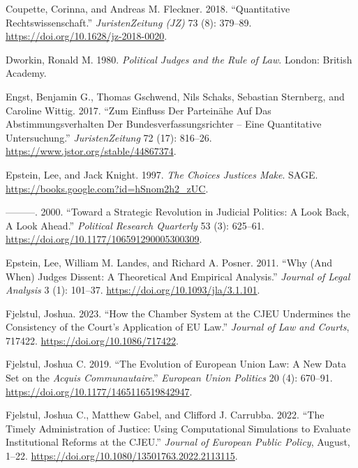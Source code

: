 \documentclass[
  11pt,
]{article}
\newlength{\cslhangindent}
\newenvironment{CSLReferences}[2] %
 {%
  \setlength{\parindent}{0pt}
  \ifodd #1 \everypar{\setlength{\hangindent}{\cslhangindent}}\ignorespaces\fi
  \ifnum #2 > 0
  \setlength{\parskip}{#2\baselineskip}
  \fi
 }%
 {}
\begin{document}
\begin{CSLReferences}{1}{0}
\leavevmode{}%
Coupette, Corinna, and Andreas M. Fleckner. 2018. {``Quantitative
{Rechtswissenschaft}.''} \emph{JuristenZeitung (JZ)} 73 (8): 379--89.
\url{https://doi.org/10.1628/jz-2018-0020}.

\leavevmode{}%
Dworkin, Ronald M. 1980. \emph{Political Judges and the Rule of Law}.
{London}: {British Academy}.

\leavevmode{}%
Engst, Benjamin G., Thomas Gschwend, Nils Schaks, Sebastian Sternberg,
and Caroline Wittig. 2017. {``Zum {Einfluss} Der {Parteinähe} Auf Das
{Abstimmungsverhalten} Der {Bundesverfassungsrichter} -- Eine
Quantitative {Untersuchung}.''} \emph{JuristenZeitung} 72 (17): 816--26.
\url{https://www.jstor.org/stable/44867374}.

\leavevmode{}%
Epstein, Lee, and Jack Knight. 1997. \emph{The {Choices Justices Make}}.
{SAGE}. \url{https://books.google.com?id=hSnom2h2_zUC}.

\leavevmode{}%
---------. 2000. {``Toward a {Strategic Revolution} in {Judicial
Politics}: {A Look Back}, {A Look Ahead}.''} \emph{Political Research
Quarterly} 53 (3): 625--61.
\url{https://doi.org/10.1177/106591290005300309}.

\leavevmode{}%
Epstein, Lee, William M. Landes, and Richard A. Posner. 2011. {``Why
({And When}) {Judges Dissent}: {A Theoretical And Empirical
Analysis}.''} \emph{Journal of Legal Analysis} 3 (1): 101--37.
\url{https://doi.org/10.1093/jla/3.1.101}.

\leavevmode{}%
Fjelstul, Joshua. 2023. {``How the {Chamber System} at the {CJEU
Undermines} the {Consistency} of the {Court}'s {Application} of {EU
Law}.''} \emph{Journal of Law and Courts}, 717422.
\url{https://doi.org/10.1086/717422}.

\leavevmode{}%
Fjelstul, Joshua C. 2019. {``The Evolution of {European Union} Law: {A}
New Data Set on the {\emph{Acquis Communautaire}}.''} \emph{European
Union Politics} 20 (4): 670--91.
\url{https://doi.org/10.1177/1465116519842947}.

\leavevmode{}%
Fjelstul, Joshua C., Matthew Gabel, and Clifford J. Carrubba. 2022.
{``The Timely Administration of Justice: Using Computational Simulations
to Evaluate Institutional Reforms at the {CJEU}.''} \emph{Journal of
European Public Policy}, August, 1--22.
\url{https://doi.org/10.1080/13501763.2022.2113115}.


\end{CSLReferences}
\end{document}
